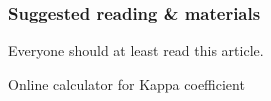 \documentclass[t]{beamer} %
\begin{document}
\begin{frame}[c]
  \frametitle{Suggested reading \& materials}

  \begin{center}
    
    \gap[1]
    Everyone should at least read this article.

    \gap[3]

    \gap[1]
    Online calculator for Kappa coefficient
    
  \end{center}
\end{frame}



\end{document}
